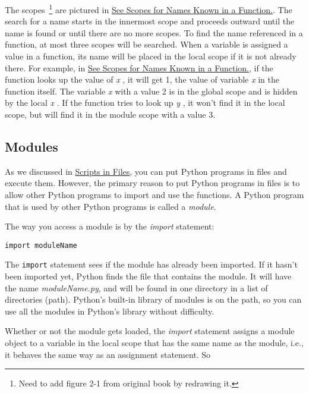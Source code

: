 The scopes~\footnote{Need to add figure 2-1 from original book by redrawing it.}  are pictured in
\href{chap2.html\#83458}{See Scopes for Names Known in a Function.}. The
search for a name starts in the innermost scope and proceeds outward
until the name is found or until there are no more scopes. To find the
name referenced in a function, at most three scopes will be searched.
When a variable is assigned a value in a function, its name will be
placed in the local scope if it is not already there. For example, in
\href{chap2.html\#83458}{See Scopes for Names Known in a Function.}, if
the function looks up the value of \emph{x} , it will get 1, the value
of variable \emph{x} in the function itself. The variable \emph{x} with
a value 2 is in the global scope and is hidden by the local \emph{x} .
If the function tries to look up \emph{y} , it won't find it in the
local scope, but will find it in the module scope with a value 3.



\subsection{Modules}

As we discussed in
\href{chap2.html\#30113}{Scripts in Files}, you can put Python programs
in files and execute them. However, the primary reason to put Python
programs in files is to allow other Python programs to import and use
the functions. A Python program that is used by other Python programs is
called a \emph{module}.

The way you access a module is by the \emph{import} statement:

\begin{verbatim}
import moduleName
\end{verbatim}

The \texttt{import} statement sees if
the module has already been imported. If it hasn't been imported yet,
Python finds the file that contains the module. It will have the name
\emph{moduleName.py}, and will be found in one directory in a list of
directories (path). Python's built-in library of modules is on the path,
so you can use all the modules in Python's library without difficulty.

Whether or not the module gets
loaded, the \emph{import} statement assigns a module object to a
variable in the local scope that has the same name as the module, i.e.,
it behaves the same way as an assignment statement. So

